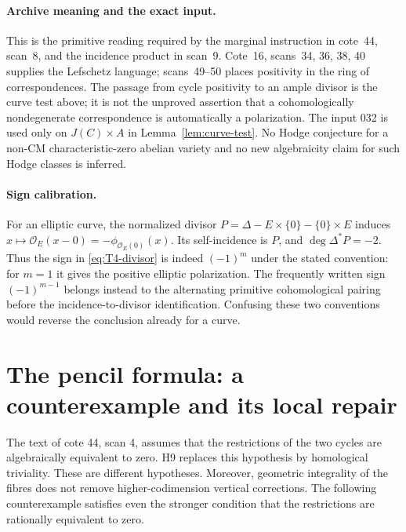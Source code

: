\documentclass[11pt,a4paper]{article}
\begin{document}
\paragraph{Archive meaning and the exact input.}
This is the primitive reading required by the marginal instruction in
cote~44, scan~8, and the incidence product in scan~9. Cote~16,
scans~34, 36, 38, 40 supplies the Lefschetz language; scans~49--50 places
positivity in the ring of correspondences. The passage from cycle
positivity to an ample divisor is the curve test above; it is not the
unproved assertion that a cohomologically nondegenerate correspondence
is automatically a polarization. The input 032 is used only on
$J(C)\times A$ in Lemma~\ref{lem:curve-test}. No Hodge conjecture for a
non-CM characteristic-zero abelian variety and no new algebraicity
claim for such Hodge classes is inferred.

\paragraph{Sign calibration.}
For an elliptic curve, the normalized divisor
$P=\Delta-E\times\{0\}-\{0\}\times E$ induces
$x\mapsto\mathcal O_E(x-0)=-\phi_{\mathcal O_E(0)}(x)$.
Its self-incidence is $P$, and $\deg\Delta^*P=-2$.
Thus the sign in \eqref{eq:T4-divisor} is indeed $(-1)^m$ under the
stated convention: for $m=1$ it gives the positive elliptic
polarization. The frequently written sign $(-1)^{m-1}$ belongs instead
to the alternating primitive cohomological pairing before the
incidence-to-divisor identification. Confusing these two conventions
would reverse the conclusion already for a curve.



\section{The pencil formula: a counterexample and its local repair}

The text of cote 44, scan 4, assumes that the restrictions of the two
cycles are algebraically equivalent to zero. H9 replaces this hypothesis by
homological triviality. These are different hypotheses. Moreover, geometric
integrality of the fibres does not remove higher-codimension vertical
corrections. The following counterexample satisfies even the stronger
condition that the restrictions are rationally equivalent to zero.
\end{document}
